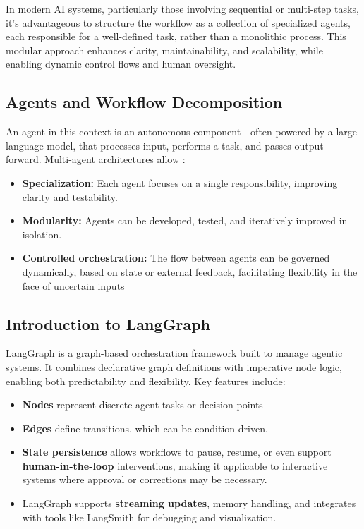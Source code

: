 In modern AI systems, particularly those involving sequential or multi-step tasks, it's advantageous to structure the workflow as a collection of specialized agents, each responsible for a well-defined task, rather than a monolithic process. This modular approach enhances clarity, maintainability, and scalability, while enabling dynamic control flows and human oversight. \cite{Chase:ThinkAboutAgentFrameworks2025}

\subsection{Agents and Workflow Decomposition}

An agent in this context is an autonomous component—often powered by a large language model, that processes input, performs a task, and passes output forward. Multi-agent architectures allow \cite{Chase:ThinkAboutAgentFrameworks2025}:

\begin{itemize}
	\item \textbf{Specialization:} Each agent focuses on a single responsibility, improving clarity and testability.
	\item \textbf{Modularity:} Agents can be developed, tested, and iteratively improved in isolation.
	\item \textbf{Controlled orchestration:} The flow between agents can be governed dynamically, based on state or external feedback, facilitating flexibility in the face of uncertain inputs
\end{itemize}


\subsection{Introduction to LangGraph}
LangGraph is a graph-based orchestration framework built to manage agentic systems. It combines declarative graph definitions with imperative node logic, enabling both predictability and flexibility. Key features include:
\begin{itemize}
\item \textbf{Nodes} represent discrete agent tasks or decision points
\item \textbf{Edges} define transitions, which can be condition-driven.
\item \textbf{State persistence} allows workflows to pause, resume, or even support \textbf{human-in-the-loop} interventions, making it applicable to interactive systems where approval or corrections may be necessary.
\item LangGraph supports \textbf{streaming updates}, memory handling, and integrates with tools like LangSmith for debugging and visualization.
\end{itemize}

